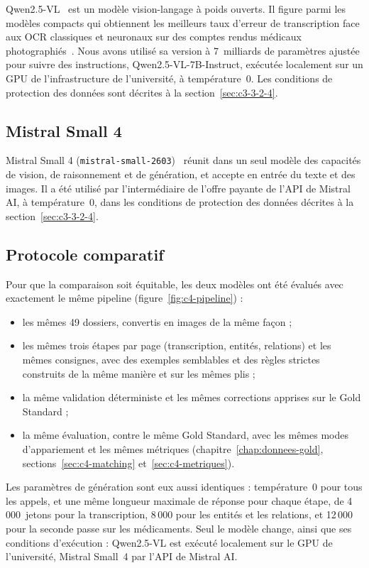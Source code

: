 Qwen2.5-VL~\cite{bai2025qwen25vl} est un modèle vision-langage à poids ouverts. Il figure parmi les modèles compacts qui obtiennent les meilleurs taux d'erreur de transcription face aux OCR classiques et neuronaux sur des comptes rendus médicaux photographiés~\cite{neveditsin2026compact}. Nous avons utilisé sa version à 7~milliards de paramètres ajustée pour suivre des instructions, Qwen2.5-VL-7B-Instruct, exécutée localement sur un GPU de l'infrastructure de l'université, à température~0. Les conditions de protection des données sont décrites à la section~\ref{sec:c3-3-2-4}.

\subsection{Mistral Small 4}\label{sec:c4-mistral}

Mistral Small 4 (\texttt{mistral-small-2603})~\cite{mistralsmall4} réunit dans un seul modèle des capacités de vision, de raisonnement et de génération, et accepte en entrée du texte et des images. Il a été utilisé par l'intermédiaire de l'offre payante de l'API de Mistral AI, à température~0, dans les conditions de protection des données décrites à la section~\ref{sec:c3-3-2-4}.

\subsection{Protocole comparatif}\label{sec:c4-protocole}

Pour que la comparaison soit équitable, les deux modèles ont été évalués avec exactement le même pipeline (figure~\ref{fig:c4-pipeline}) :
\begin{itemize}
  \item les mêmes 49 dossiers, convertis en images de la même façon ;
  \item les mêmes trois étapes par page (transcription, entités, relations) et les mêmes consignes, avec des exemples semblables et des règles strictes construits de la même manière et sur les mêmes plis ;
  \item la même validation déterministe et les mêmes corrections apprises sur le Gold Standard ;
  \item la même évaluation, contre le même Gold Standard, avec les mêmes modes d'appariement et les mêmes métriques (chapitre~\ref{chap:donnees-gold}, sections~\ref{sec:c4-matching} et~\ref{sec:c4-metriques}).
\end{itemize}
Les paramètres de génération sont eux aussi identiques : température~0 pour tous les appels, et une même longueur maximale de réponse pour chaque étape, de 4\,000~jetons pour la transcription, 8\,000 pour les entités et les relations, et 12\,000 pour la seconde passe sur les médicaments. Seul le modèle change, ainsi que ses conditions d'exécution : Qwen2.5-VL est exécuté localement sur le GPU de l'université, Mistral Small~4 par l'API de Mistral AI.


